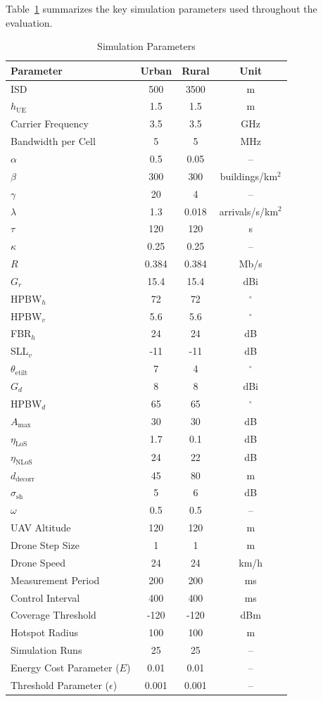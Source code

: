\documentclass[12pt]{report}
\begin{document}
Table~\ref{tab:simparams} summarizes the key simulation parameters used throughout the evaluation.
\begin{table}[H]
\centering
\caption{Simulation Parameters}
\label{tab:simparams}

\renewcommand{\arraystretch}{1.1}

\begin{tabular}{l c c c}
\toprule
\textbf{Parameter} & \textbf{Urban} & \textbf{Rural} & \textbf{Unit} \\
\midrule

ISD & 500 & 3500 & m \\
$h_{\mathrm{UE}}$ & 1.5 & 1.5 & m \\
Carrier Frequency & 3.5 & 3.5 & GHz \\
Bandwidth per Cell & 5 & 5 & MHz \\
$\alpha$ & 0.5 & 0.05 & -- \\
$\beta$ & 300 & 300 & buildings/km$^2$ \\
$\gamma$ & 20 & 4 & -- \\
$\lambda$ & 1.3 & 0.018 & arrivals/s/km$^2$ \\
$\tau$ & 120 & 120 & s \\
$\kappa$ & 0.25 & 0.25 & -- \\
$R$ & 0.384 & 0.384 & Mb/s \\
$G_r$ & 15.4 & 15.4 & dBi \\
HPBW$_h$ & 72 & 72 & $^\circ$ \\
HPBW$_v$ & 5.6 & 5.6 & $^\circ$ \\
FBR$_h$ & 24 & 24 & dB \\
SLL$_v$ & -11 & -11 & dB \\
$\theta_{\mathrm{etilt}}$ & 7 & 4 & $^\circ$ \\
$G_d$ & 8 & 8 & dBi \\
HPBW$_d$ & 65 & 65 & $^\circ$ \\
$A_{\max}$ & 30 & 30 & dB \\
$\eta_{\mathrm{LoS}}$ & 1.7 & 0.1 & dB \\
$\eta_{\mathrm{NLoS}}$ & 24 & 22 & dB \\
$d_{\mathrm{decorr}}$ & 45 & 80 & m \\
$\sigma_{\mathrm{sh}}$ & 5 & 6 & dB \\
$\omega$ & 0.5 & 0.5 & -- \\
UAV Altitude & 120 & 120 & m \\
Drone Step Size & 1 & 1 & m \\
Drone Speed & 24 & 24 & km/h \\
Measurement Period & 200 & 200 & ms \\
Control Interval & 400 & 400 & ms \\
Coverage Threshold & -120 & -120 & dBm \\
Hotspot Radius & 100 & 100 & m \\
Simulation Runs & 25 & 25 & -- \\
Energy Cost Parameter ($E$) & 0.01 & 0.01 & -- \\
Threshold Parameter ($\epsilon$) & 0.001 & 0.001 & -- \\

\bottomrule
\end{tabular}
\end{table}
\end{document}
